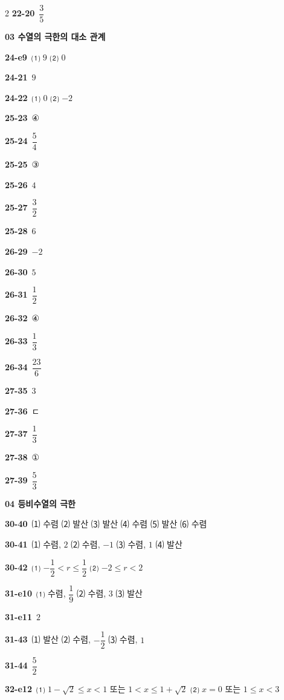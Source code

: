 \documentclass[10pt,a4paper]{article}
\begin{document}
\begin{multicols}{2}
\noindent\textbf{22-20}\ $\dfrac{3}{5}$\par
\noindent\textbf{03 수열의 극한의 대소 관계}\par\smallskip
\noindent\textbf{24-e9}\ ⑴ $9$ ⑵ $0$\par
\noindent\textbf{24-21}\ $9$\par
\noindent\textbf{24-22}\ ⑴ $0$ ⑵ $-2$\par
\noindent\textbf{25-23}\ ④\par
\noindent\textbf{25-24}\ $\dfrac{5}{4}$\par
\noindent\textbf{25-25}\ ③\par
\noindent\textbf{25-26}\ $4$\par
\noindent\textbf{25-27}\ $\dfrac{3}{2}$\par
\noindent\textbf{25-28}\ $6$\par
\noindent\textbf{26-29}\ $-2$\par
\noindent\textbf{26-30}\ $5$\par
\noindent\textbf{26-31}\ $\dfrac{1}{2}$\par
\noindent\textbf{26-32}\ ④\par
\noindent\textbf{26-33}\ $\dfrac{1}{3}$\par
\noindent\textbf{26-34}\ $\dfrac{23}{6}$\par
\noindent\textbf{27-35}\ $3$\par
\noindent\textbf{27-36}\ ㄷ\par
\noindent\textbf{27-37}\ $\dfrac{1}{3}$\par
\noindent\textbf{27-38}\ ①\par
\noindent\textbf{27-39}\ $\dfrac{5}{3}$\par
\noindent\textbf{04 등비수열의 극한}\par\smallskip
\noindent\textbf{30-40}\ ⑴ 수렴 ⑵ 발산 ⑶ 발산 ⑷ 수렴 ⑸ 발산 ⑹ 수렴\par
\noindent\textbf{30-41}\ ⑴ 수렴, $2$ ⑵ 수렴, $-1$ ⑶ 수렴, $1$ ⑷ 발산\par
\noindent\textbf{30-42}\ ⑴ $-\dfrac{1}{2}<r\le\dfrac{1}{2}$ ⑵ $-2\le r<2$\par
\noindent\textbf{31-e10}\ ⑴ 수렴, $\dfrac{1}{9}$ ⑵ 수렴, $3$ ⑶ 발산\par
\noindent\textbf{31-e11}\ $2$\par
\noindent\textbf{31-43}\ ⑴ 발산 ⑵ 수렴, $-\dfrac{1}{2}$ ⑶ 수렴, $1$\par
\noindent\textbf{31-44}\ $\dfrac{5}{2}$\par
\noindent\textbf{32-e12}\ ⑴ $1-\sqrt{2}\le x<1$ 또는 $1<x\le 1+\sqrt{2}$ ⑵ $x=0$ 또는 $1\le x<3$\par

\end{multicols}
\end{document}
